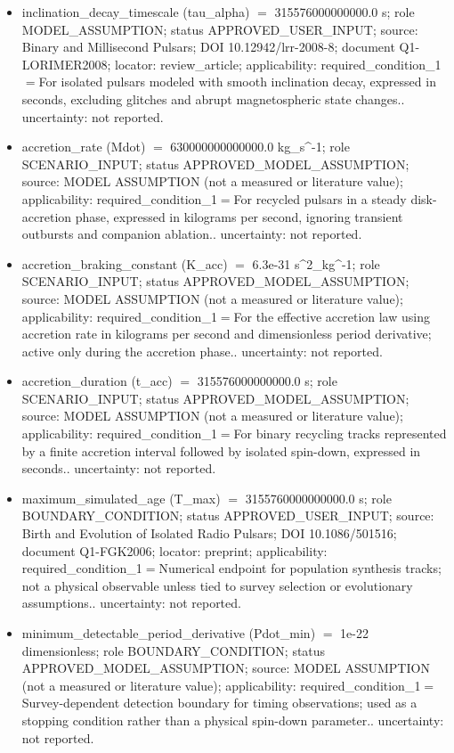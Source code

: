 \documentclass[11pt]{article}
\begin{document}
\begin{itemize}
\item inclination\_decay\_timescale (tau\_alpha) \ensuremath{=} 315576000000000.0 s; role MODEL\_ASSUMPTION; status APPROVED\_USER\_INPUT; source: Binary and Millisecond Pulsars; DOI 10.12942/lrr-2008-8; document Q1-LORIMER2008; locator: review\_article; applicability: required\_condition\_1\ensuremath{=}For isolated pulsars modeled with smooth inclination decay, expressed in seconds, excluding glitches and abrupt magnetospheric state changes.. uncertainty: not reported.
\item accretion\_rate (Mdot) \ensuremath{=} 630000000000000.0 kg\_s\textasciicircum{}-1; role SCENARIO\_INPUT; status APPROVED\_MODEL\_ASSUMPTION; source: MODEL ASSUMPTION (not a measured or literature value); applicability: required\_condition\_1\ensuremath{=}For recycled pulsars in a steady disk-accretion phase, expressed in kilograms per second, ignoring transient outbursts and companion ablation.. uncertainty: not reported.
\item accretion\_braking\_constant (K\_acc) \ensuremath{=} 6.3e-31 s\textasciicircum{}2\_kg\textasciicircum{}-1; role SCENARIO\_INPUT; status APPROVED\_MODEL\_ASSUMPTION; source: MODEL ASSUMPTION (not a measured or literature value); applicability: required\_condition\_1\ensuremath{=}For the effective accretion law using accretion rate in kilograms per second and dimensionless period derivative; active only during the accretion phase.. uncertainty: not reported.
\item accretion\_duration (t\_acc) \ensuremath{=} 315576000000000.0 s; role SCENARIO\_INPUT; status APPROVED\_MODEL\_ASSUMPTION; source: MODEL ASSUMPTION (not a measured or literature value); applicability: required\_condition\_1\ensuremath{=}For binary recycling tracks represented by a finite accretion interval followed by isolated spin-down, expressed in seconds.. uncertainty: not reported.
\item maximum\_simulated\_age (T\_max) \ensuremath{=} 3155760000000000.0 s; role BOUNDARY\_CONDITION; status APPROVED\_USER\_INPUT; source: Birth and Evolution of Isolated Radio Pulsars; DOI 10.1086/501516; document Q1-FGK2006; locator: preprint; applicability: required\_condition\_1\ensuremath{=}Numerical endpoint for population synthesis tracks; not a physical observable unless tied to survey selection or evolutionary assumptions.. uncertainty: not reported.
\item minimum\_detectable\_period\_derivative (Pdot\_min) \ensuremath{=} 1e-22 dimensionless; role BOUNDARY\_CONDITION; status APPROVED\_MODEL\_ASSUMPTION; source: MODEL ASSUMPTION (not a measured or literature value); applicability: required\_condition\_1\ensuremath{=}Survey-dependent detection boundary for timing observations; used as a stopping condition rather than a physical spin-down parameter.. uncertainty: not reported.

\end{itemize}
\end{document}

